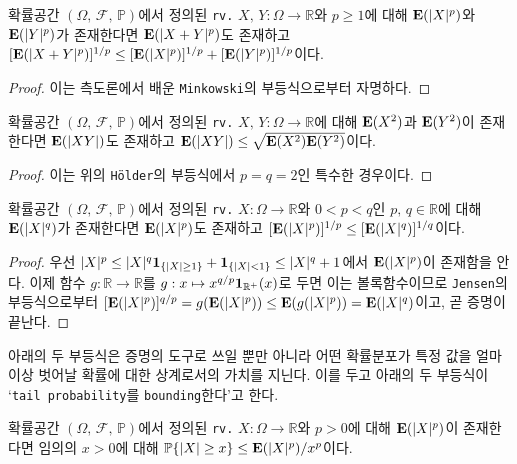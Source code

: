 \begin{theorem}
    확률공간 $(\Omega,\,\mathcal{F},\,\mathbb{P})$에서 정의된 \texttt{rv.} $X,\,Y:\Omega\to\mathbb{R}$와 $p\geq1$에 대해 $\mathbf{E}(|X|^p)$와 $\mathbf{E}(|Y|^p)$가 존재한다면 $\mathbf{E}(|X+Y|^p)$도 존재하고 $[\mathbf{E}(|X+Y|^p)]^{1/p}\leq[\mathbf{E}(|X|^p)]^{1/p}+[\mathbf{E}(|Y|^p)]^{1/p}$이다.
\end{theorem}

\begin{proof}
    이는 측도론에서 배운 \texttt{Minkowski}의 부등식으로부터 자명하다.
\end{proof}

\begin{corollary}
    확률공간 $(\Omega,\,\mathcal{F},\,\mathbb{P})$에서 정의된 \texttt{rv.} $X,\,Y:\Omega\to\mathbb{R}$에 대해 $\mathbf{E}(X^2)$과 $\mathbf{E}(Y^2)$이 존재한다면 $\mathbf{E}(|XY|)$도 존재하고 $\mathbf{E}(|XY|)\leq\sqrt{\mathbf{E}(X^2)\mathbf{E}(Y^2)}$이다.
\end{corollary}

\begin{proof}
    이는 위의 \texttt{H\"older}의 부등식에서 $p=q=2$인 특수한 경우이다.
\end{proof}

\begin{theorem}
    확률공간 $(\Omega,\,\mathcal{F},\,\mathbb{P})$에서 정의된 \texttt{rv.} $X:\Omega\to\mathbb{R}$와 $0<p<q$인 $p,\,q\in\mathbb{R}$에 대해 $\mathbf{E}(|X|^q)$가 존재한다면 $\mathbf{E}(|X|^p)$도 존재하고 $[\mathbf{E}(|X|^p)]^{1/p}\leq[\mathbf{E}(|X|^q)]^{1/q}$이다.
\end{theorem}

\begin{proof}
    우선 $|X|^p\leq|X|^q\mathbf{1}_{\{|X|\geq1\}}+\mathbf{1}_{\{|X|<1\}}\leq|X|^q+1$에서 $\mathbf{E}(|X|^p)$이 존재함을 안다. 이제 함수 $g:\mathbb{R}\to\mathbb{R}$를 $g:x\mapsto x^{q/p}\mathbf{1}_{\mathbb{R}^+}(x)$로 두면 이는 볼록함수이므로 \texttt{Jensen}의 부등식으로부터 $[\mathbf{E}(|X|^p)]^{q/p}=g(\mathbf{E}(|X|^p))\leq\mathbf{E}(g(|X|^p))=\mathbf{E}(|X|^q)$이고, 곧 증명이 끝난다.
\end{proof}

아래의 두 부등식은 증명의 도구로 쓰일 뿐만 아니라 어떤 확률분포가 특정 값을 얼마 이상 벗어날 확률에 대한 상계로서의 가치를 지닌다. 이를 두고 아래의 두 부등식이 `\texttt{tail probability}를 \texttt{bounding}한다'고 한다.

\begin{theorem}
    확률공간 $(\Omega,\,\mathcal{F},\,\mathbb{P})$에서 정의된 \texttt{rv.} $X:\Omega\to\mathbb{R}$와 $p>0$에 대해 $\mathbf{E}(|X|^p)$이 존재한다면 임의의 $x>0$에 대해 $\mathbb{P}\{|X|\geq x\}\leq\mathbf{E}(|X|^p)/x^p$이다.
\end{theorem}

